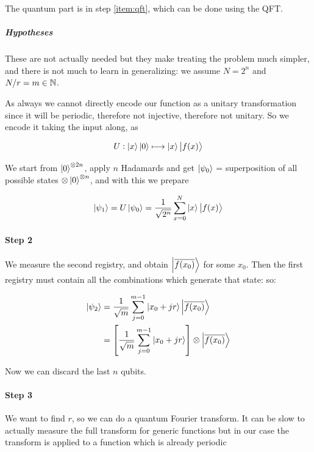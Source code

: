\documentclass[main.tex]{subfiles}
\begin{document}
The quantum part is in step \ref{item:qft}, which can be done using the QFT.

\subparagraph{Hypotheses} These are not actually needed but they make treating the problem much simpler, and there is not much to learn in generalizing: we assume \( N = 2^n \) and \( N/r = m \in \mathbb{N} \).

As always we cannot directly encode our function as a unitary transformation since it will be periodic, therefore not injective, therefore not unitary. So we encode it taking the input along, as

\begin{equation}
   U: \ket{x}\ket{0} \longmapsto \ket{x} \ket{f(x)}
\end{equation}

We start from \( \ket{0}^{\otimes 2n} \), apply \(n\) Hadamards and get \( \ket{\psi_0} \) = superposition of all possible states \(\otimes \ket{0}^{\otimes n} \), and with this
we prepare

\begin{equation}
  \ket{\psi_1} = U \ket{\psi_0}
  = \frac{1}{\sqrt{2^n}} \sum _{x=0} ^{N}   \ket{x} \ket{f(x)}
\end{equation}

\paragraph{Step 2}

We measure the second registry, and obtain \( \ket{\overline{f(x_0)}}\) for some \(x_0\). Then the first registry must contain all the combinations which generate that state: so:

\begin{subequations}
\begin{align}
  \ket{\psi_2}
  &= \frac{1}{\sqrt{m}}\sum _{j=0} ^{m-1} \ket{x_0 + jr} \ket{\overline{f(x_0)}}  \\
  &= \qty[\frac{1}{\sqrt{m}}\sum _{j=0} ^{m-1} \ket{x_0 + jr} ] \otimes \ket{\overline{f(x_0)}}
\end{align}
\end{subequations}

Now we can discard the last \(n\) qubits.

\paragraph{Step 3}

We want to find \( r \), so we can do a quantum Fourier transform. It can be slow  to actually measure the full transform for generic functions but in our case the transform is applied to a function which is already periodic
\end{document}
